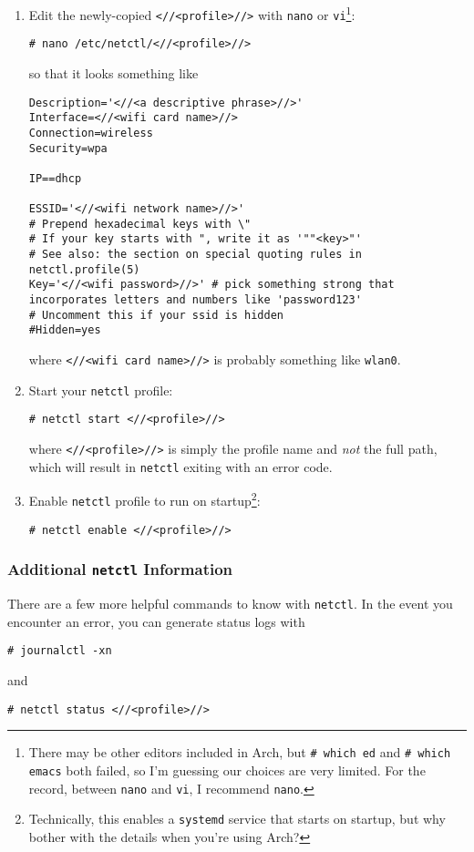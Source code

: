 \documentclass[12pt,letterpaper]{article}
\begin{document}
\begin{enumerate}
\item Edit the newly-copied \lstinline{<//<profile>//>} with \lstinline{nano} or \lstinline{vi}\footnote{There may be other editors included in Arch, but \lstinline{# which ed} and \lstinline{# which emacs} both failed, so I'm guessing our choices are very limited.  For the record, between \lstinline{nano} and \lstinline{vi}, I recommend \lstinline{nano}.}:
\begin{lstlisting}
# nano /etc/netctl/<//<profile>//>
\end{lstlisting}
so that it looks something like
\begin{lstlisting}[basicstyle=\ttfamily\footnotesize]
Description='<//<a descriptive phrase>//>'
Interface=<//<wifi card name>//>
Connection=wireless
Security=wpa

IP==dhcp

ESSID='<//<wifi network name>//>'
# Prepend hexadecimal keys with \"
# If your key starts with ", write it as '""<key>"'
# See also: the section on special quoting rules in netctl.profile(5)
Key='<//<wifi password>//>' # pick something strong that incorporates letters and numbers like 'password123'
# Uncomment this if your ssid is hidden
#Hidden=yes
\end{lstlisting}
where \lstinline{<//<wifi card name>//>} is probably something like \lstinline{wlan0}.

\item Start your \lstinline{netctl} profile:
\begin{lstlisting}
# netctl start <//<profile>//>
\end{lstlisting}
where \lstinline{<//<profile>//>} is simply the profile name and \emph{not} the full path, which will result in \lstinline{netctl} exiting with an error code.

\item Enable \lstinline{netctl} profile to run on startup\footnote{Technically, this enables a \lstinline{systemd} service that starts on startup, but why bother with the details when you're using Arch?}:
\begin{lstlisting}
# netctl enable <//<profile>//>
\end{lstlisting}

\end{enumerate}

\subsubsection{Additional \lstinline{netctl} Information}
There are a few more helpful commands to know with \lstinline{netctl}.  In the event you encounter an error, you can generate status logs with
\begin{lstlisting}
# journalctl -xn
\end{lstlisting}
and
\begin{lstlisting}
# netctl status <//<profile>//>
\end{lstlisting}
\end{document}
